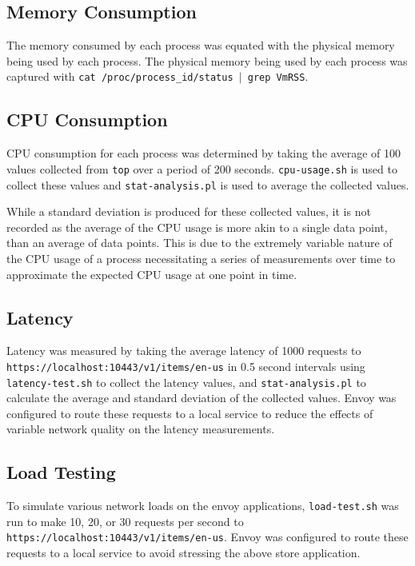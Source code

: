 \documentclass{article}
\begin{document}
\subsection{Memory Consumption}
The memory consumed by each process was equated with the physical memory being used by each process. The physical memory being used by each process was captured with \texttt{cat /proc/process\_id/status $|$ grep VmRSS}.

\subsection{CPU Consumption}
CPU consumption for each process was determined by taking the average of 100 values collected from \texttt{top} over a period of 200 seconds. \texttt{cpu-usage.sh} is used to collect these values and \texttt{stat-analysis.pl} is used to average the collected values.

While a standard deviation is produced for these collected values, it is not recorded as the average of the CPU usage is more akin to a single data point, than an average of data points. This is due to the extremely variable nature of the CPU usage of a process necessitating a series of measurements over time to approximate the expected CPU usage at one point in time.

\subsection{Latency}
Latency was measured by taking the average latency of 1000 requests to\\
\texttt{https://localhost:10443/v1/items/en-us} in 0.5 second intervals using\\
\texttt{latency-test.sh} to collect the latency values, and \texttt{stat-analysis.pl} to calculate the average and standard deviation of the collected values. Envoy was configured to route these requests to a local service to reduce the effects of variable network quality on the latency measurements.

\subsection{Load Testing}
To simulate various network loads on the envoy applications, \texttt{load-test.sh} was run to make 10, 20, or 30 requests per second to \texttt{https://localhost:10443/v1/items/en-us}. Envoy was configured to route these requests to a local service to avoid stressing the above store application.
\end{document}
